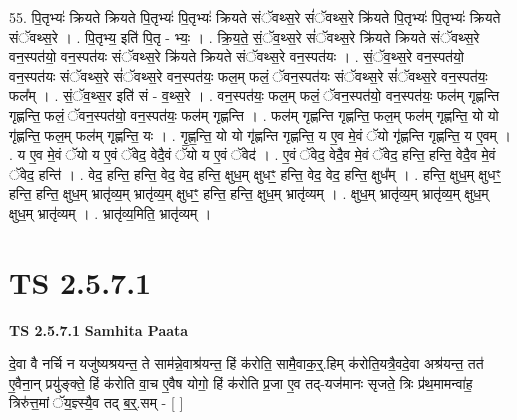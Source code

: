 \documentclass[17pt]{extarticle}
\begin{document}
55. पि॒तृभ्यः॑ क्रियते क्रियते पि॒तृभ्यः॑ पि॒तृभ्यः॑ क्रियते संॅवथ्स॒रे सं॑ॅवथ्स॒रे क्रि॑यते पि॒तृभ्यः॑ पि॒तृभ्यः॑ क्रियते संॅवथ्स॒रे । . पि॒तृभ्य॒ इति॑ पि॒तृ - भ्यः॒ । . क्रि॒य॒ते॒ सं॒ॅव॒थ्स॒रे सं॑ॅवथ्स॒रे क्रि॑यते क्रियते संॅवथ्स॒रे वन॒स्पत॑यो॒ वन॒स्पत॑यः संॅवथ्स॒रे क्रि॑यते क्रियते संॅवथ्स॒रे वन॒स्पत॑यः । . सं॒ॅव॒थ्स॒रे वन॒स्पत॑यो॒ वन॒स्पत॑यः संॅवथ्स॒रे सं॑ॅवथ्स॒रे वन॒स्पत॑यः॒ फल॒म् फलं॒ ॅवन॒स्पत॑यः संॅवथ्स॒रे सं॑ॅवथ्स॒रे वन॒स्पत॑यः॒ फल᳚म् । . सं॒ॅव॒थ्स॒र इति॑ सं - व॒थ्स॒रे । . वन॒स्पत॑यः॒ फल॒म् फलं॒ ॅवन॒स्पत॑यो॒ वन॒स्पत॑यः॒ फल॑म् गृह्णन्ति गृह्णन्ति॒ फलं॒ ॅवन॒स्पत॑यो॒ वन॒स्पत॑यः॒ फल॑म् गृह्णन्ति । . फल॑म् गृह्णन्ति गृह्णन्ति॒ फल॒म् फल॑म् गृह्णन्ति॒ यो यो गृ॑ह्णन्ति॒ फल॒म् फल॑म् गृह्णन्ति॒ यः । . गृ॒ह्ण॒न्ति॒ यो यो गृ॑ह्णन्ति गृह्णन्ति॒ य ए॒व मे॒वं ॅयो गृ॑ह्णन्ति गृह्णन्ति॒ य ए॒वम् । . य ए॒व मे॒वं ॅयो य ए॒वं ॅवेद॒ वेदै॒वं ॅयो य ए॒वं ॅवेद॑ । . ए॒वं ॅवेद॒ वेदै॒व मे॒वं ॅवेद॒ हन्ति॒ हन्ति॒ वेदै॒व मे॒वं ॅवेद॒ हन्ति॑ । . वेद॒ हन्ति॒ हन्ति॒ वेद॒ वेद॒ हन्ति॒ क्षुध॒म् क्षुधꣳ॒॒ हन्ति॒ वेद॒ वेद॒ हन्ति॒ क्षुध᳚म् । . हन्ति॒ क्षुध॒म् क्षुधꣳ॒॒ हन्ति॒ हन्ति॒ क्षुध॒म् भ्रातृ॑व्य॒म् भ्रातृ॑व्य॒म् क्षुधꣳ॒॒ हन्ति॒ हन्ति॒ क्षुध॒म् भ्रातृ॑व्यम् । . क्षुध॒म् भ्रातृ॑व्य॒म् भ्रातृ॑व्य॒म् क्षुध॒म् क्षुध॒म् भ्रातृ॑व्यम् । . भ्रातृ॑व्य॒मिति॒ भ्रातृ॑व्यम् । \newline
\pagebreak
{}

\section{ TS 2.5.7.1 }

\textbf{TS 2.5.7.1 } \newline
\textbf{Samhita Paata} \newline

दे॒वा वै नर्चि न यजु॑ष्यश्रयन्त॒ ते साम॑न्ने॒वाश्र॑यन्त॒ हिं क॑रोति॒ सामै॒वाक॒॒र्॒.हिम् क॑रोति॒यत्रै॒वदे॒वा अश्र॑यन्त॒ तत॑ ए॒वैना॒न् प्रयु॑ङ्क्ते॒ हिं क॑रोति वा॒च ए॒वैष योगो॒ हिं क॑रोति प्र॒जा ए॒व तद्-यज॑मानः सृजते॒ त्रिः प्र॑थ॒मामन्वा॑ह॒ त्रिरु॑त्त॒मां ॅय॒ज्ञ्स्यै॒व तद् ब॒र्॒.सम् - [  ] \newline
\end{document}
